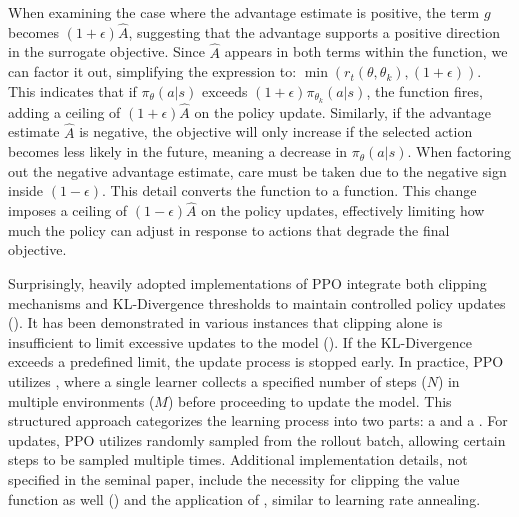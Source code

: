\noindent When examining the case where the advantage estimate is positive, the term $g$ becomes $(1+\epsilon)\hat{A}$, suggesting that the advantage supports a positive direction in the surrogate objective. Since $\hat{A}$ appears in both terms within the  function, we can factor it out, simplifying the expression to: $\min(r_t(\theta, \theta_k), (1+\epsilon))$. This indicates that if $\pi_{\theta}(a|s)$ exceeds $(1+\epsilon)\pi_{\theta_k}(a|s)$, the  function fires, adding a ceiling of $(1+\epsilon)\hat{A}$ on the policy update. Similarly, if the advantage estimate $\hat{A}$ is negative, the objective will only increase if the selected action becomes less likely in the future, meaning a decrease in $\pi_{\theta}(a|s)$. When factoring out the negative advantage estimate, care must be taken due to the negative sign inside $(1-\epsilon)$. This detail converts the  function to a  function. This change imposes a ceiling of \( (1-\epsilon)\hat{A} \) on the policy updates, effectively limiting how much the policy can adjust in response to actions that degrade the final objective.

\bigskip

\noindent Surprisingly, heavily adopted implementations of PPO integrate both clipping mechanisms and KL-Divergence thresholds to maintain controlled policy updates (\textcolor{deepblue}{\cite{shengyi2022the37implementation}}). It has been demonstrated in various instances that clipping alone is insufficient to limit excessive updates to the model (\textcolor{deepblue}{\cite{stable-baselines-issue213}}). If the KL-Divergence exceeds a predefined limit, the update process is stopped early. In practice, PPO utilizes , where a single learner collects a specified number of steps ($N$) in multiple environments ($M$) before proceeding to update the model. This structured approach categorizes the learning process into two parts: a  and a . For updates, PPO utilizes  randomly sampled from the rollout batch, allowing certain steps to be sampled multiple times. Additional implementation details, not specified in the seminal paper, include the necessity for clipping the value function as well (\textcolor{deepblue}{\cite{Engstrom2020Implementation}}) and the application of , similar to learning rate annealing. 

